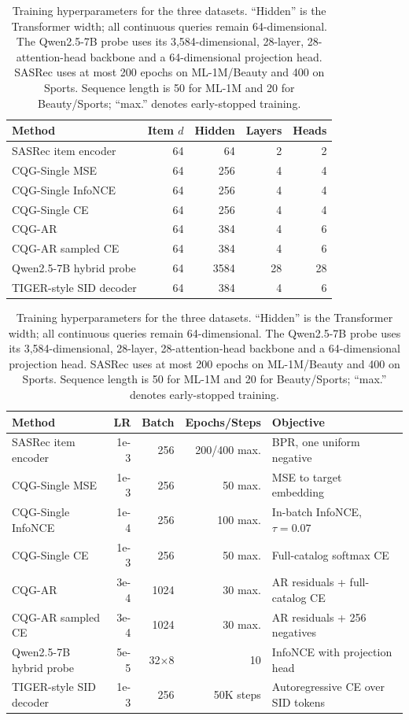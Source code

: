 \documentclass[letterpaper]{article}
\begin{document}
\begin{table}[H]
\centering
\small
\setlength{\tabcolsep}{5pt}
\begin{tabular}{lrrrr}
\toprule
Method & Item $d$ & Hidden & Layers & Heads \\
\midrule
SASRec item encoder & 64 & 64 & 2 & 2 \\
CQG-Single MSE & 64 & 256 & 4 & 4 \\
CQG-Single InfoNCE & 64 & 256 & 4 & 4 \\
CQG-Single CE & 64 & 256 & 4 & 4 \\
CQG-AR & 64 & 384 & 4 & 6 \\
CQG-AR sampled CE & 64 & 384 & 4 & 6 \\
Qwen2.5-7B hybrid probe & 64 & 3584 & 28 & 28 \\
TIGER-style SID decoder & 64 & 384 & 4 & 6 \\
\bottomrule
\end{tabular}

\vspace{4pt}

\begin{tabular}{lrrrl}
\toprule
Method & LR & Batch & Epochs/Steps & Objective \\
\midrule
SASRec item encoder & 1e-3 & 256 & 200/400 max. & BPR, one uniform negative \\
CQG-Single MSE & 1e-3 & 256 & 50 max. & MSE to target embedding \\
CQG-Single InfoNCE & 1e-4 & 256 & 100 max. & In-batch InfoNCE, $\tau=0.07$ \\
CQG-Single CE & 1e-3 & 256 & 50 max. & Full-catalog softmax CE \\
CQG-AR & 3e-4 & 1024 & 30 max. & AR residuals + full-catalog CE \\
CQG-AR sampled CE & 3e-4 & 1024 & 30 max. & AR residuals + 256 negatives \\
Qwen2.5-7B hybrid probe & 5e-5 & 32$\times$8 & 10 & InfoNCE with projection head \\
TIGER-style SID decoder & 1e-3 & 256 & 50K steps & Autoregressive CE over SID tokens \\
\bottomrule
\end{tabular}
\caption{Training hyperparameters for the three datasets. ``Hidden'' is the
Transformer width; all continuous queries remain 64-dimensional. The
Qwen2.5-7B probe uses its 3,584-dimensional, 28-layer, 28-attention-head
backbone and a 64-dimensional projection head. SASRec uses at most 200 epochs on
ML-1M/Beauty and 400 on Sports. Sequence length is 50 for ML-1M and 20 for
Beauty/Sports; ``max.'' denotes early-stopped training.}
\label{tab:hparams}
\end{table}
\end{document}
